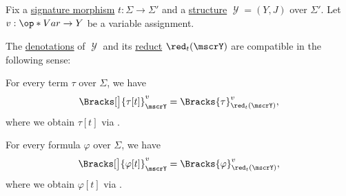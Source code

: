 \begin{proposition}\label{thm:fol_structure_reduct_denotation}
  Fix a \hyperref[def:fol_signature_category/morphisms]{signature morphism} \( t: \Sigma \to \Sigma' \) and a \hyperref[def:fol_structure]{structure} \( \mscrY = (Y, J) \) over \( \Sigma' \). Let \( v: \op*{Var} \to Y \) be a variable assignment.

  The \hyperref[alg:fol_formula_denotation]{denotations} of \( \mscrY \) and its \hyperref[def:fol_reduct_along_morphism]{reduct} \( \red_t(\mscrY) \) are compatible in the following sense:
  \begin{thmenum}
     For every term \( \tau \) over \( \Sigma \), we have
    \begin{equation*}
      \Bracks[\big]{\tau[t]}_\mscrY^v = \Bracks{\tau}_{\red_t(\mscrY)}^v,
    \end{equation*}
    where we obtain \( \tau[t] \) via .

     For every formula \( \varphi \) over \( \Sigma \), we have
    \begin{equation*}
      \Bracks[\big]{\varphi[t]}_\mscrY^v = \Bracks{\varphi}_{\red_t(\mscrY)}^v,
    \end{equation*}
    where we obtain \( \varphi[t] \) via .
  \end{thmenum}
\end{proposition}
